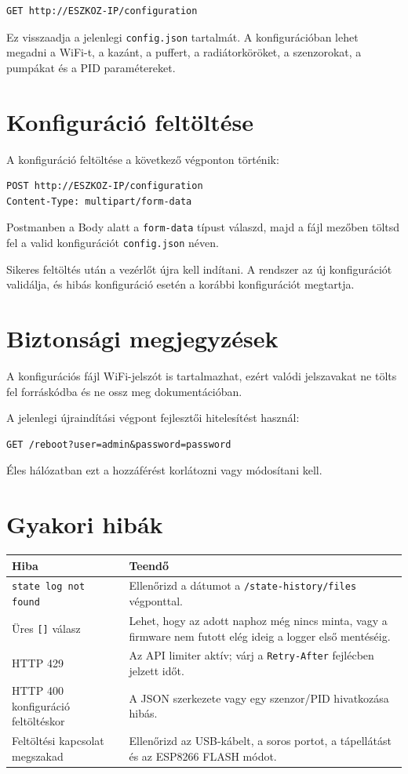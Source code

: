 \documentclass[11pt,a4paper]{article}
\begin{document}
\begin{lstlisting}
GET http://ESZKOZ-IP/configuration
\end{lstlisting}

Ez visszaadja a jelenlegi \texttt{config.json} tartalmát. A konfigurációban lehet megadni a WiFi-t, a kazánt, a puffert, a radiátorköröket, a szenzorokat, a pumpákat és a PID paramétereket.

\section{Konfiguráció feltöltése}

A konfiguráció feltöltése a következő végponton történik:

\begin{lstlisting}
POST http://ESZKOZ-IP/configuration
Content-Type: multipart/form-data
\end{lstlisting}

Postmanben a Body alatt a \texttt{form-data} típust válaszd, majd a fájl mezőben töltsd fel a valid konfigurációt \texttt{config.json} néven.

Sikeres feltöltés után a vezérlőt újra kell indítani. A rendszer az új konfigurációt validálja, és hibás konfiguráció esetén a korábbi konfigurációt megtartja.

\section{Biztonsági megjegyzések}

A konfigurációs fájl WiFi-jelszót is tartalmazhat, ezért valódi jelszavakat ne tölts fel forráskódba és ne ossz meg dokumentációban.

A jelenlegi újraindítási végpont fejlesztői hitelesítést használ:

\begin{lstlisting}
GET /reboot?user=admin&password=password
\end{lstlisting}

Éles hálózatban ezt a hozzáférést korlátozni vagy módosítani kell.

\section{Gyakori hibák}

\begin{longtable}{p{}p{}}
\toprule
Hiba & Teendő \\
\midrule
\texttt{state log not found} & Ellenőrizd a dátumot a \texttt{/state-history/files} végponttal. \\
Üres \texttt{[]} válasz & Lehet, hogy az adott naphoz még nincs minta, vagy a firmware nem futott elég ideig a logger első mentéséig. \\
HTTP 429 & Az API limiter aktív; várj a \texttt{Retry-After} fejlécben jelzett időt. \\
HTTP 400 konfiguráció feltöltéskor & A JSON szerkezete vagy egy szenzor/PID hivatkozása hibás. \\
Feltöltési kapcsolat megszakad & Ellenőrizd az USB-kábelt, a soros portot, a tápellátást és az ESP8266 FLASH módot. \\
\bottomrule
\end{longtable}
\end{document}
